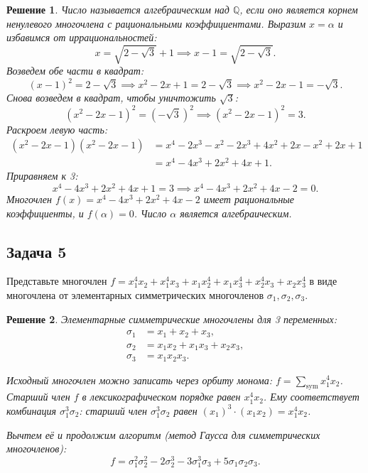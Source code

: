 \documentclass[14pt]{article}
\newtheorem*{solution}{Решение}
\begin{document}
	\begin{solution}
		Число называется алгебраическим над $\mathbb{Q}$, если оно является корнем ненулевого многочлена с рациональными коэффициентами. Выразим $x = \alpha$ и избавимся от иррациональностей:
		\[
		x = \sqrt{2 - \sqrt{3}} + 1 \implies x - 1 = \sqrt{2 - \sqrt{3}}.
		\]
		Возведем обе части в квадрат:
		\[
		(x - 1)^2 = 2 - \sqrt{3} \implies x^2 - 2x + 1 = 2 - \sqrt{3} \implies x^2 - 2x - 1 = -\sqrt{3}.
		\]
		Снова возведем в квадрат, чтобы уничтожить $\sqrt{3}$:
		\[
		(x^2 - 2x - 1)^2 = (-\sqrt{3})^2 \implies (x^2 - 2x - 1)^2 = 3.
		\]
		Раскроем левую часть:
		\begin{align*}
			(x^2 - 2x - 1)(x^2 - 2x - 1) &= x^4 - 2x^3 - x^2 - 2x^3 + 4x^2 + 2x - x^2 + 2x + 1 \\
			&= x^4 - 4x^3 + 2x^2 + 4x + 1.
		\end{align*}
		Приравняем к 3:
		\[
		x^4 - 4x^3 + 2x^2 + 4x + 1 = 3 \implies x^4 - 4x^3 + 2x^2 + 4x - 2 = 0.
		\]
		Многочлен $f(x) = x^4 - 4x^3 + 2x^2 + 4x - 2$ имеет рациональные коэффициенты, и $f(\alpha) = 0$. Число $\alpha$ является алгебраическим.
	\end{solution}
	
	\subsection*{Задача 5}
	Представьте многочлен $f = x_1^4 x_2 + x_1^4 x_3 + x_1 x_2^4 + x_1 x_3^4 + x_2^4 x_3 + x_2 x_3^4$ в виде многочлена от элементарных симметрических многочленов $\sigma_1, \sigma_2, \sigma_3$.
	
	\begin{solution}
		Элементарные симметрические многочлены для 3 переменных:
		\begin{align*}
			\sigma_1 &= x_1 + x_2 + x_3, \\
			\sigma_2 &= x_1 x_2 + x_1 x_3 + x_2 x_3, \\
			\sigma_3 &= x_1 x_2 x_3.
		\end{align*}
		
		Исходный многочлен можно записать через орбиту монома: $f = \sum_{\text{sym}} x_1^4 x_2$. 
		Старший член $f$ в лексикографическом порядке равен $x_1^4 x_2$. Ему соответствует комбинация $\sigma_1^3 \sigma_2$: старший член $\sigma_1^3 \sigma_2$ равен $(x_1)^3 \cdot (x_1 x_2) = x_1^4 x_2$.
		
		Вычтем её и продолжим алгоритм (метод Гаусса для симметрических многочленов):
		\[
		f = \sigma_1^2 \sigma_2^2 - 2\sigma_2^3 - 3\sigma_1^3 \sigma_3 + 5\sigma_1 \sigma_2 \sigma_3.
		\]
	\end{solution}
	
\end{document}
